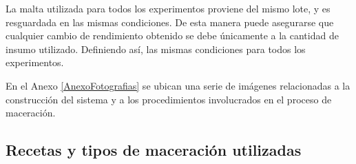         \par La malta utilizada para todos los experimentos proviene del mismo lote, y es resguardada en las mismas condiciones. De esta manera puede asegurarse que cualquier cambio de rendimiento obtenido se debe únicamente a la cantidad de insumo utilizado. Definiendo así, las mismas condiciones para todos los experimentos.
        
        En el Anexo \ref{AnexoFotografias} se ubican una serie de imágenes relacionadas a la construcción del sistema y a los procedimientos involucrados en el proceso de maceración.
        
        \subsection{Recetas y tipos de maceración utilizadas}
        

